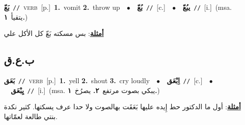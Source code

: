 \documentclass[10pt,a4paper,twoside]{article} %
\begin{document}
\begin{multicols}{2}
{\setlength\topsep{0pt}\textbf{\foreignlanguage{arabic}{بَعّ}}\ {\color{gray}\texttt{//}\color{black}}\ \textsc{verb}\ [p.]\ \textbf{1.}~vomit  \textbf{2.}~throw up\ \ $\bullet$\ \ \setlength\topsep{0pt}\textbf{\foreignlanguage{arabic}{بُعّ}}\ {\color{gray}\texttt{//}\color{black}}\ [c.]\ \ $\bullet$\ \ \setlength\topsep{0pt}\textbf{\foreignlanguage{arabic}{يبُعّ}}\ {\color{gray}\texttt{//}\color{black}}\ [i.]\ \color{gray}(msa. \foreignlanguage{arabic}{يتقيأ}~\foreignlanguage{arabic}{\textbf{١.}})\color{black}\  \begin{flushright}\color{gray}\foreignlanguage{arabic}{\textbf{\underline{\foreignlanguage{arabic}{أمثلة}}}: بس مسكته بَعّ كل الأكل علي}\end{flushright}\color{black}} \vspace{2mm}

\vspace{-3mm}
\subsection*{\color{blue}\foreignlanguage{arabic}{ب.ع.ق}\color{blue}{}} 

{\setlength\topsep{0pt}\textbf{\foreignlanguage{arabic}{بَعَق}}\ {\color{gray}\texttt{//}\color{black}}\ \textsc{verb}\ [p.]\ \textbf{1.}~yell  \textbf{2.}~shout  \textbf{3.}~cry loudly\ \ $\bullet$\ \ \setlength\topsep{0pt}\textbf{\foreignlanguage{arabic}{اِبْعَق}}\ {\color{gray}\texttt{//}\color{black}}\ [c.]\ \ $\bullet$\ \ \setlength\topsep{0pt}\textbf{\foreignlanguage{arabic}{يِبْعَق}}\ {\color{gray}\texttt{//}\color{black}}\ [i.]\ \color{gray}(msa. \foreignlanguage{arabic}{يبكي بصوت مرتفع}~\foreignlanguage{arabic}{\textbf{٢.}}  \foreignlanguage{arabic}{يصرُخ}~\foreignlanguage{arabic}{\textbf{١.}})\color{black}\  \begin{flushright}\color{gray}\foreignlanguage{arabic}{\textbf{\underline{\foreignlanguage{arabic}{أمثلة}}}: أول ما الدكتور حط إِيده عليها بَعَقَت بهالصوت ولا حدا عرف يسكتها. كثير نكدة بنتي طالعة لعمّاتها.}\end{flushright}\color{black}} \vspace{2mm}


\end{multicols}
\end{document}
